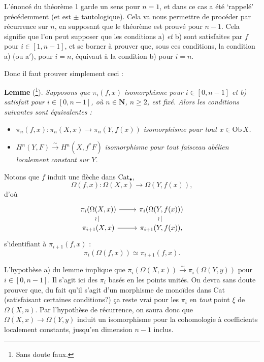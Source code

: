 \documentclass[11pt]{article}
\newcommand{\printedpage}[1]{\marginpar{\footnotesize p.~#1}}
\newcommand{\msp}[1]{\marginpar{\footnotesize [#1]}}
\newcommand{\Ob}{\mathrm{Ob}\,}
\begin{document}
L'énoncé du théorème 1 garde un sens pour $n = 1$, et dans ce cas a été `rappelé' précédemment (et est $\pm$ tautologique). Cela va nous permettre de procéder par récurrence sur $n$, en supposant que le théorème est prouvé pour $n-1$. Cela signifie que l'on peut supposer que les conditions a) \textit{et} b) sont satisfaites par $f$ pour $i \in [1,n-1]$, et se borner à prouver que, sous ces conditions, la condition a) (ou a$'$), pour $i = n$, équivaut à la condition b) pour $i = n$.

\msp{page 177}

Donc il faut prouver simplement ceci :

\textbf{Lemme} (\footnote[115]{Sans doute faux.}). \textit{Supposons que $\pi_i(f,x)$} \textit{isomorphisme pour $i \in [0,n-1]$ et b) satisfait pour $i \in [0,n-1]$, où $n \in \mathbf{N}$, $n \geq 2$, est fixé. Alors les conditions suivantes sont équivalentes :}

\begin{itemize}
\item[\textit{a)}] $\pi_n(f,x) : \pi_n(X,x) \longrightarrow \pi_n(Y,f(x))$ \textit{isomorphisme pour tout $x \in \Ob X$.}

\item[\textit{b)}] $H^n(Y,F) \xrightarrow{\sim} H^n(X,f^*F)$ \textit{isomorphisme pour tout faisceau abélien localement constant sur $Y$.}
\end{itemize}

Notons que $f$ induit une flèche dans $\mathrm{Cat}_\bullet$,
\[
\Omega(f,x) : \Omega(X,x) \longrightarrow \Omega(Y,f(x)),
\]
d'où
\[
\begin{tikzcd}[row sep=small]
\pi_i(\Omega(X,x)) \arrow[r] \arrow[d, dash, "\wr"'] & \pi_i(\Omega(Y,f(x))) \arrow[d, dash, "\wr"'] \\
\pi_{i+1}(X,x) \arrow[r] & \pi_{i+1}(Y,f(x)),
\end{tikzcd}
\]
s'identifiant à $\pi_{i+1}(f,x)$ :
\[
\pi_i(\Omega(f,x)) \simeq \pi_{i+1}(f,x).
\]


\printedpage{119}

L'hypothèse a) du lemme implique que $\pi_i(\Omega(X,x)) \xrightarrow{\sim} \pi_i(\Omega(Y,y))$ pour $i \in [0,n-1]$. Il s'agit ici des $\pi_i$ basés en les points unités. On devra sans doute prouver que, du fait qu'il s'agit d'un morphisme de monoïdes dans Cat (satisfaisant certaines conditions?) ça reste vrai pour les $\pi_i$ en \textit{tout} point $\xi$ de $\Omega(X,n)$. Par l'hypothèse de récurrence, on saura donc que $\Omega(X,x) \longrightarrow \Omega(Y,y)$ %
\msp{page 178}
induit un isomorphisme pour la cohomologie à coefficients localement constants, jusqu'en dimension $n-1$ inclus.
\end{document}
